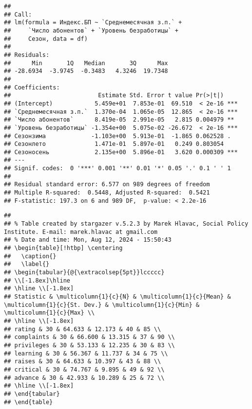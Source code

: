 \documentclass[
]{article}
\begin{document}
\begin{verbatim}
## 
## Call:
## lm(formula = Индекс.БП ~ `Среднемесячная з.п.` + 
##     `Число абонентов` + `Уровень безработицы` + 
##     Сезон, data = df)
## 
## Residuals:
##      Min       1Q   Median       3Q      Max 
## -28.6934  -3.9745  -0.3483   4.3246  19.7348 
## 
## Coefficients:
##                         Estimate Std. Error t value Pr(>|t|)    
## (Intercept)            5.459e+01  7.853e-01  69.510  < 2e-16 ***
## `Среднемесячная з.п.`  1.370e-04  1.065e-05  12.865  < 2e-16 ***
## `Число абонентов`      8.419e-05  2.991e-05   2.815 0.004979 ** 
## `Уровень безработицы` -1.354e+00  5.075e-02 -26.672  < 2e-16 ***
## Сезонзима             -1.103e+00  5.913e-01  -1.865 0.062528 .  
## Сезонлето              1.471e-01  5.897e-01   0.249 0.803054    
## Сезоносень             2.135e+00  5.896e-01   3.620 0.000309 ***
## ---
## Signif. codes:  0 '***' 0.001 '**' 0.01 '*' 0.05 '.' 0.1 ' ' 1
## 
## Residual standard error: 6.577 on 989 degrees of freedom
## Multiple R-squared:  0.5448, Adjusted R-squared:  0.5421 
## F-statistic: 197.3 on 6 and 989 DF,  p-value: < 2.2e-16
\end{verbatim}

\begin{verbatim}
## 
## % Table created by stargazer v.5.2.3 by Marek Hlavac, Social Policy Institute. E-mail: marek.hlavac at gmail.com
## % Date and time: Mon, Aug 12, 2024 - 15:50:43
## \begin{table}[!htbp] \centering 
##   \caption{} 
##   \label{} 
## \begin{tabular}{@{\extracolsep{5pt}}lccccc} 
## \\[-1.8ex]\hline 
## \hline \\[-1.8ex] 
## Statistic & \multicolumn{1}{c}{N} & \multicolumn{1}{c}{Mean} & \multicolumn{1}{c}{St. Dev.} & \multicolumn{1}{c}{Min} & \multicolumn{1}{c}{Max} \\ 
## \hline \\[-1.8ex] 
## rating & 30 & 64.633 & 12.173 & 40 & 85 \\ 
## complaints & 30 & 66.600 & 13.315 & 37 & 90 \\ 
## privileges & 30 & 53.133 & 12.235 & 30 & 83 \\ 
## learning & 30 & 56.367 & 11.737 & 34 & 75 \\ 
## raises & 30 & 64.633 & 10.397 & 43 & 88 \\ 
## critical & 30 & 74.767 & 9.895 & 49 & 92 \\ 
## advance & 30 & 42.933 & 10.289 & 25 & 72 \\ 
## \hline \\[-1.8ex] 
## \end{tabular} 
## \end{table}
\end{verbatim}
\end{document}
